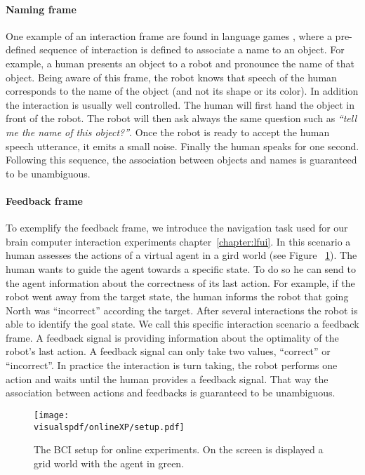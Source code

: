 \paragraph{Naming frame} One example of an interaction frame are found in language games \cite{steels2002aibos}, where a pre-defined sequence of interaction is defined to associate a name to an object. For example, a human presents an object to a robot and pronounce the name of that object. Being aware of this frame, the robot knows that speech of the human corresponds to the name of the object (and not its shape or its color). In addition the interaction is usually well controlled. The human will first hand the object in front of the robot. The robot will then ask always the same question such as \emph{``tell me the name of this object?''}. Once the robot is ready to accept the human speech utterance, it emits a small noise.  Finally the human speaks for one second. Following this sequence, the association between objects and names is guaranteed to be unambiguous.

\paragraph{Feedback frame} 

To exemplify the feedback frame, we introduce the navigation task used for our brain computer interaction experiments chapter~\ref{chapter:lfui}. In this scenario a human assesses the actions of a virtual agent in a gird world (see Figure ~\ref{fig:feedbackBCIexample}). The human wants to guide the agent towards a specific state. To do so he can send to the agent information about the correctness of its last action. For example, if the robot went away from the target state, the human informs the robot that going North was ``incorrect'' according the target. After several interactions the robot is able to identify the goal state. We call this specific interaction scenario a feedback frame. A feedback signal is providing information about the optimality of the robot's last action. A feedback signal can only take two values, ``correct'' or ``incorrect''. In practice the interaction is turn taking, the robot performs one action and waits until the human provides a feedback signal. That way the association between actions and feedbacks is guaranteed to be unambiguous.

\begin{figure}[!htbp]
\centering
\texttt{[image: \\visualspdf/onlineXP/setup.pdf]}
\caption{The BCI setup for online experiments. On the screen is displayed a grid world with the agent in green.}
\label{fig:feedbackBCIexample}
\end{figure}

